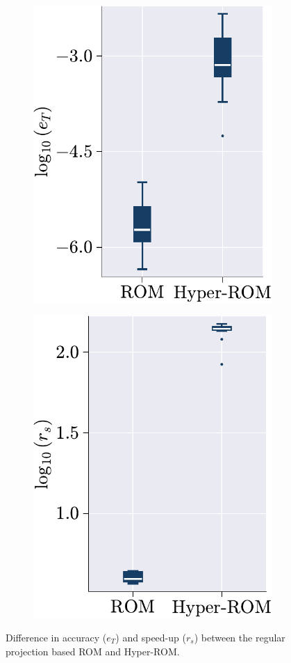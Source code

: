 \documentclass[11pt]{article}
\begin{document}
\begin{figure}[t!]
\centering
\begin{subfigure}[b]{0.47\linewidth}
\centering
\includegraphics[height=0.95\linewidth]{error_comp_rom_hrom_deim.pdf}
\caption{}
\label{fig:HROM_ERROR_SPDUP_a_deim}
\end{subfigure}\hfill
\begin{subfigure}[b]{0.47\linewidth}
\centering
\includegraphics[height=0.95\linewidth]{speed_up_comp_rom_hrom_deim.pdf}
\caption{}
\label{fig:HROM_ERROR_SPDUP_b_deim}
\end{subfigure}
\caption{Difference in accuracy ($e_T$) and speed-up ($r_s$) between the regular projection based ROM and Hyper-ROM.}
\label{fig:HROM_ERROR_SPDUP_deim}
\end{figure}
\end{document}
